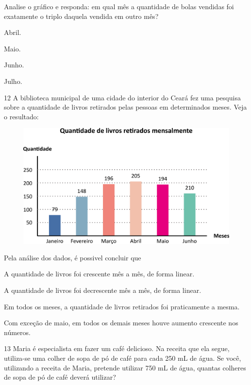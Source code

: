 Analise o gráfico e responda: em qual mês a quantidade de bolas vendidas foi exatamente o triplo daquela vendida em outro mês?

\begin{multicols}{2}
\begin{escolha}
\item
  Abril.
\item
  Maio.
\item
  Junho.
\item
  Julho.
\end{escolha}
\end{multicols}

\num{12} A biblioteca municipal de uma cidade do interior do Ceará fez uma pesquisa sobre a quantidade de livros retirados pelas pessoas em determinados meses. Veja o resultado:
\pagebreak

\begin{figure}[htpb!]
\centering
\includegraphics[width=\textwidth]{./media/image106.png}
\end{figure}

Pela análise dos dados, é possivel concluir que

\begin{escolha}
\item
  A quantidade de livros foi crescente mês a mês, de forma linear.
\item
  A quantidade de livros foi decrescente mês a mês, de forma linear.
\item
  Em todos os meses, a quantidade de livros retirados foi praticamente a mesma.
\item
  Com exceção de maio, em todos os demais meses houve aumento crescente nos números.
\end{escolha}

\num{13} Maria é especialista em fazer um café delicioso. Na receita que ela segue, utiliza-se uma colher de sopa de pó de café para cada 250 mL de água. Se você, utilizando a receita de Maria, pretende utilizar 750 mL de água, quantas colheres de sopa de pó de café deverá utilizar?

